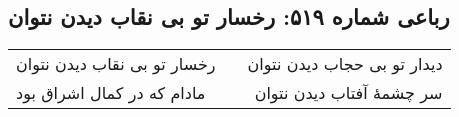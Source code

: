 \begin{center}
\section*{رباعی شماره ۵۱۹: رخسار تو بی نقاب دیدن نتوان}
\label{sec:sh519}
\begin{longtable}{l p{0.5cm} r}
رخسار تو بی نقاب دیدن نتوان
&&
دیدار تو بی حجاب دیدن نتوان
\\
مادام که در کمال اشراق بود
&&
سر چشمهٔ آفتاب دیدن نتوان
\\
\end{longtable}
\end{center}
